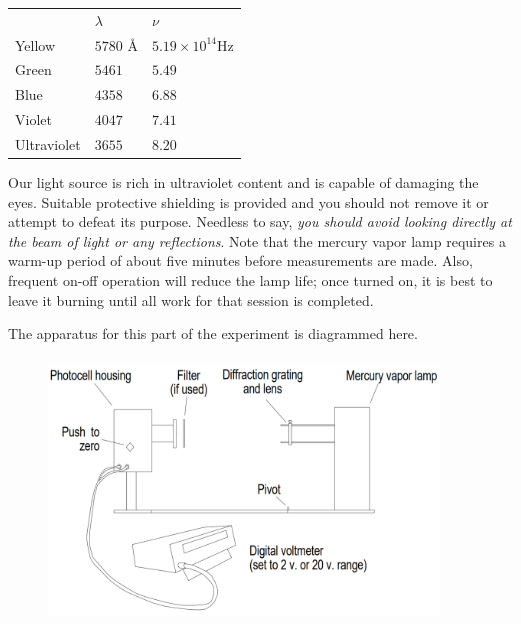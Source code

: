 \begin{center}
\begin{tabular}{ l l l }
 & $\lambda$ & $\nu$\\
Yellow\footnotemark
  & $5780$ Å\footnotemark
  & $5.19\!\times\!10^{14} \text{Hz}$\\

Green & $5461$ & $5.49$\\

Blue & $4358$ & $6.88$\\

Violet & $4047$ &$7.41$\\

Ultraviolet & $3655$ & $8.20$\\

\end{tabular}
\end{center}



Our light source is rich in ultraviolet content and is capable of
damaging the eyes. Suitable protective shielding is provided and you
should not remove it or attempt to defeat its purpose. Needless to say,
\emph{you should avoid looking directly at the beam of light or any
reflections}. Note that the mercury vapor lamp requires a warm-up period
of about five minutes before measurements are made. Also, frequent
on-off operation will reduce the lamp life; once turned on, it is best
to leave it burning until all work for that session is completed.

The apparatus for this part of the experiment is diagrammed here.
\begin{figure}[h]
  \begin{center}
  \includegraphics[width=4.08333in,height=2.77083in]{images/06_einstein/003.png}
  \end{center}
\end{figure}



